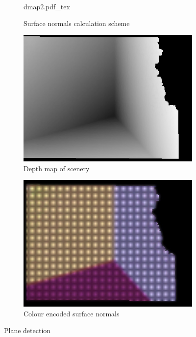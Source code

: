 \begin{figure}[htpb]
        \centering
        \begin{subfigure}[b]{0.31\textwidth}
	      \centering
               \def\svgwidth{.78\textwidth}
               {dmap2.pdf_tex}
                \caption{Surface normals calculation scheme \cite{Yoo:2013he}}
                \label{img:normalsCalculation}
        \end{subfigure}
         \hfill
                  \begin{subfigure}[b]{0.31\textwidth}      
                \includegraphics[width=\textwidth]{images/software/gt/GroundTruth.jpg}
                \caption{Depth map of scenery\newline}
                \label{img:normalGT}
        \end{subfigure}
         \hfill
         \begin{subfigure}[b]{0.31\textwidth}      
                \includegraphics[width=\textwidth]{images/software/gt/normalsImage_mod_2.jpg}
                \caption{Colour encoded surface normals}
                \label{img:normals}
        \end{subfigure}
        \caption{Plane detection}\label{fig:animals}
\end{figure}
